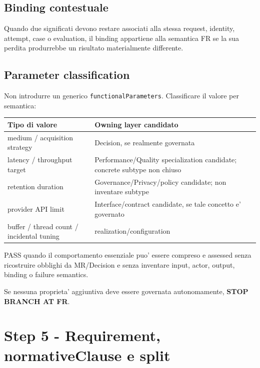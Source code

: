 \documentclass[11pt,a4paper]{article}
\begin{document}
\subsection{Binding contestuale}
\closedtag

Quando due significati devono restare associati alla stessa request, identity, attempt, case o evaluation, il binding appartiene alla semantica FR se la sua perdita produrrebbe un risultato materialmente differente.

\subsection{Parameter classification}
\closedtag

Non introdurre un generico \texttt{functionalParameters}. Classificare il valore per semantica:

\begin{tabularx}{\textwidth}{L{53mm}Y}
\toprule
\textbf{Tipo di valore} & \textbf{Owning layer candidato} \\
\midrule
medium / acquisition strategy & Decision, se realmente governata \\
latency / throughput target & Performance/Quality specialization candidate; concrete subtype non chiuso \\
retention duration & Governance/Privacy/policy candidate; non inventare subtype \\
provider API limit & Interface/contract candidate, se tale concetto e' governato \\
buffer / thread count / incidental tuning & realization/configuration \\
\bottomrule
\end{tabularx}

\begin{ddtacheck}[title={Gate D3 - FR + STOP}]
PASS quando il comportamento essenziale puo' essere compreso e assessed senza ricostruire obblighi da MR/Decision e senza inventare input, actor, output, binding o failure semantics.

Se nessuna proprieta' aggiuntiva deve essere governata autonomamente, \textbf{STOP BRANCH AT FR}.
\end{ddtacheck}

\section{Step 5 - Requirement, normativeClause e split}
\closedtag
\end{document}
